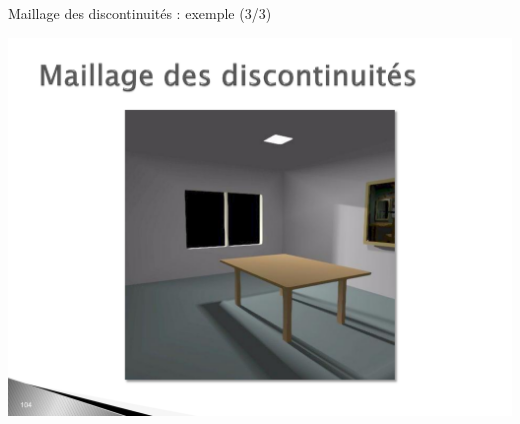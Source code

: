     \begin{frame}{Maillage des discontinuités : exemple (3/3)}
        \begin{center}
            \includegraphics[width=.5\textwidth]{figs/md-3.pdf}
        \end{center}    
        \end{frame}



        